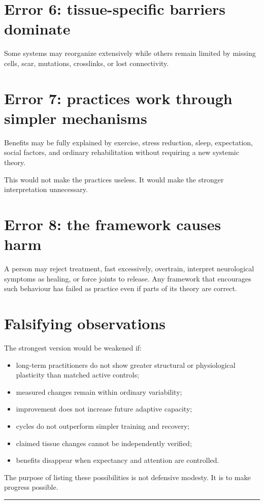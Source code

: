 \section{Error 6: tissue-specific barriers dominate}

Some systems may reorganize extensively while others remain limited by missing cells, scar, mutations, crosslinks, or lost connectivity.

\section{Error 7: practices work through simpler mechanisms}

Benefits may be fully explained by exercise, stress reduction, sleep, expectation, social factors, and ordinary rehabilitation without requiring a new systemic theory.

This would not make the practices useless. It would make the stronger interpretation unnecessary.

\section{Error 8: the framework causes harm}

A person may reject treatment, fast excessively, overtrain, interpret neurological symptoms as healing, or force joints to release. Any framework that encourages such behaviour has failed as practice even if parts of its theory are correct.

\section{Falsifying observations}

The strongest version would be weakened if:

\begin{itemize}
\tightlist
\item
  long-term practitioners do not show greater structural or physiological plasticity than matched active controls;
\item
  measured changes remain within ordinary variability;
\item
  improvement does not increase future adaptive capacity;
\item
  cycles do not outperform simpler training and recovery;
\item
  claimed tissue changes cannot be independently verified;
\item
  benefits disappear when expectancy and attention are controlled.
\end{itemize}

The purpose of listing these possibilities is not defensive modesty. It is to make progress possible.

\begin{center}\rule{0.5\linewidth}{0.5pt}\end{center}
